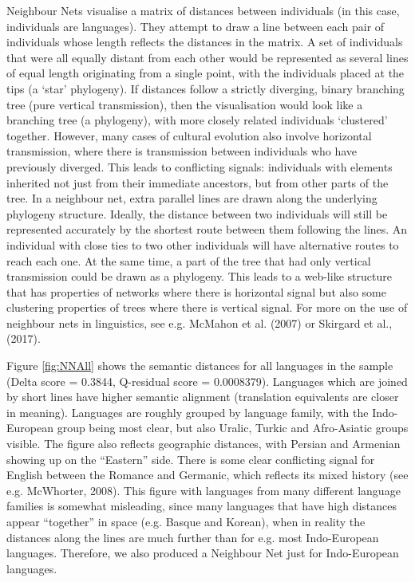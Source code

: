 \documentclass[notitlepage]{report}
\begin{document}
Neighbour Nets visualise a matrix of distances between individuals (in this case, individuals are languages). They attempt to draw a line between each pair of individuals whose length reflects the distances in the matrix.  A set of individuals that were all equally distant from each other would be represented as several lines of equal length originating from a single point, with the individuals placed at the tips (a `star' phylogeny).  If distances follow a strictly diverging, binary branching tree (pure vertical transmission), then the visualisation would look like a branching tree (a phylogeny), with more closely related individuals `clustered' together. However, many cases of cultural evolution also involve horizontal transmission, where there is transmission between individuals who have previously diverged. This leads to conflicting signals: individuals with elements inherited not just from their immediate ancestors, but from other parts of the tree. In a neighbour net, extra parallel lines are drawn along the underlying phylogeny structure. Ideally, the distance between two individuals will still be represented accurately by the shortest route between them following the lines. An individual with close ties to two other individuals will have alternative routes to reach each one. At the same time, a part of the tree that had only vertical transmission could be drawn as a phylogeny. This leads to a web-like structure that has properties of networks where there is horizontal signal but also some clustering properties of trees where there is vertical signal. For more on the use of neighbour nets in linguistics, see e.g. McMahon et al. (2007) or Skirgard et al., (2017). 

Figure \ref{fig:NNAll} shows the semantic distances for all languages in the sample (Delta score = 0.3844, Q-residual score = 0.0008379). Languages which are joined by short lines have higher semantic alignment (translation equivalents are closer in meaning).  Languages are roughly grouped by language family, with the Indo-European group being most clear, but also Uralic, Turkic and Afro-Asiatic groups visible. The figure also reflects geographic distances, with Persian and Armenian showing up on the ``Eastern'' side.  There is some clear conflicting signal for English between the Romance and Germanic, which reflects its mixed history (see e.g. McWhorter, 2008). This figure with languages from many different language families is somewhat misleading, since many languages that have high distances appear ``together'' in space (e.g. Basque and Korean), when in reality the distances along the lines are much further than for e.g. most Indo-European languages. Therefore, we also produced a Neighbour Net just for Indo-European languages.
\end{document}
